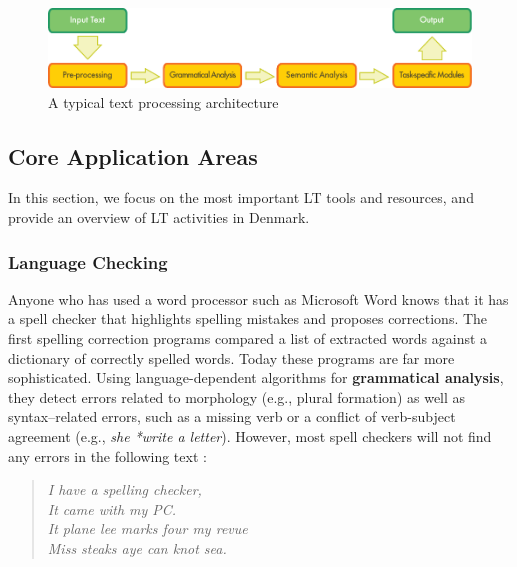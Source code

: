 \begin{multicols}{2}
\begin{figure}[htb]
  \center
  \includegraphics[width=\textwidth]{../_media/english/text_processing_app_architecture}
  \caption{A typical text processing architecture}
  \label{fig:textprocessingarch_en}
\end{figure}

\subsection{Core Application Areas}

In this section, we focus on the most important LT tools and resources, and provide an overview of LT activities in Denmark. 

\subsubsection{Language Checking}

Anyone who has used a word processor such as Microsoft Word knows that it has a spell checker that highlights spelling mistakes and proposes corrections. The first spelling correction programs compared a list of extracted words against a dictionary of correctly spelled words. Today these programs are far more sophisticated. Using language-dependent algorithms for \textbf{grammatical analysis}, they detect errors related to morphology (e.g., plural formation) as well as syntax–related errors, such as a missing verb or a conflict of verb-subject agreement (e.g., \textit{she *write a letter}). However, most spell checkers will not find any errors in the following text \cite{zar1}:

\begin{quote}
  {\it I have a spelling checker,\\
  It came with my PC.\\
  It plane lee marks four my revue\\
  Miss steaks aye can knot sea.}
\end{quote}


\end{multicols}
